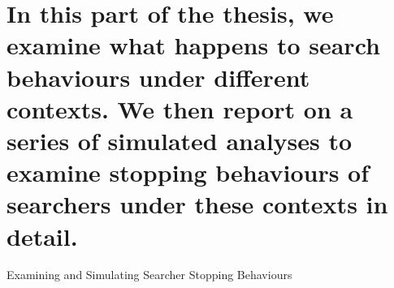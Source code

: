 
\part[Stopping Behaviours in Context]{In this part of the thesis, we examine what happens to search behaviours under different contexts. We then report on a series of simulated analyses to examine stopping behaviours of searchers under these contexts in detail.}{Examining and Simulating Searcher Stopping Behaviours}\label{part:context}